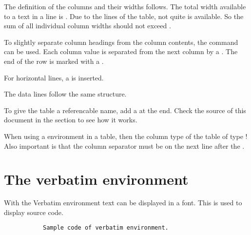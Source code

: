 The definition of the columns and their widths follows. The total width
available to a text in a line is . Due
to the lines of the table, not quite 
is available. So the sum of all individual column widths should not exceed
.
\bigbreak

To slightly separate column headings from the column contents, the\linebreak
{} command can be used. Each
column value is separated from the next column by a \tsTextMonospace{\&}. The end
of the row is marked with a \tsTextMonospace{\tsBackslash{}\tsBackslash{}}.
\bigbreak

For horizontal lines, a  is inserted.
\bigbreak

The data lines follow the same structure.
\bigbreak

To give the table a referencable name, add a
 at the end.
Check the source of this document in the section 
to see how it works.
\bigbreak

When using a  environment in a table, then the
column type of the table  of type !
Also important is that the column separator \tsTextMonospace{\&} must be on
the next line after the .

\section{The verbatim environment}

With the Verbatim environment text can be displayed in a
 font. This is used to display source code.

\begin{figure}[H]
    \centering
    \begin{verbbox}
\begin{figure}[H]
    \small
    \centering
    \begin{BVerbatim}
Sample code of verbatim environment.
    \end{BVerbatim}
\end{figure}
    \end{verbbox}
    \theverbbox
\end{figure}

